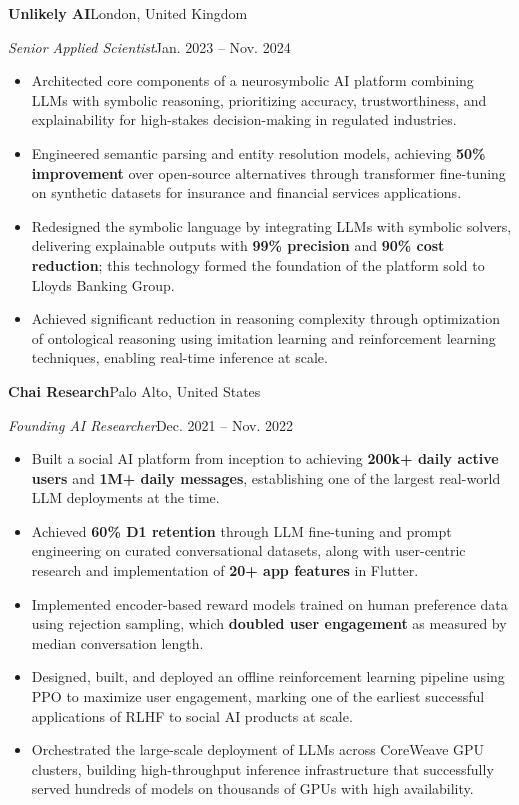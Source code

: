 \documentclass[10pt,a4paper]{article}
\newcommand{\experience}[4]{%
    \textbf{#1}\hfill #2\par\vspace{-0.5\baselineskip}%
    \textit{#3}\hfill #4\par\vspace{-0.5\baselineskip}%
}
\begin{document}
\experience{Unlikely AI}{London, United Kingdom}
{Senior Applied Scientist}{Jan. 2023 -- Nov. 2024}
\begin{itemize}
    \item Architected core components of a neurosymbolic AI platform combining LLMs with symbolic reasoning, prioritizing accuracy, trustworthiness, and explainability for high-stakes decision-making in regulated industries.
    \item Engineered semantic parsing and entity resolution models, achieving \textbf{50\% improvement} over open-source alternatives through transformer fine-tuning on synthetic datasets for insurance and financial services applications.
    \item Redesigned the symbolic language by integrating LLMs with symbolic solvers, delivering explainable outputs with \textbf{99\% precision} and \textbf{90\% cost reduction}; this technology formed the foundation of the platform sold to Lloyds Banking Group.
    \item Achieved significant reduction in reasoning complexity through optimization of ontological reasoning using imitation learning and reinforcement learning techniques, enabling real-time inference at scale.
\end{itemize}

\experience{Chai Research}{Palo Alto, United States}
{Founding AI Researcher}{Dec. 2021 -- Nov. 2022}
\begin{itemize}
    \item Built a social AI platform from inception to achieving \textbf{200k+ daily active users} and \textbf{1M+ daily messages}, establishing one of the largest real-world LLM deployments at the time.
    \item Achieved \textbf{60\% D1 retention} through LLM fine-tuning and prompt engineering on curated conversational datasets, along with user-centric research and implementation of \textbf{20+ app features} in Flutter.
    \item Implemented encoder-based reward models trained on human preference data using rejection sampling, which \textbf{doubled user engagement} as measured by median conversation length.
    \item Designed, built, and deployed an offline reinforcement learning pipeline using PPO to maximize user engagement, marking one of the earliest successful applications of RLHF to social AI products at scale.
    \item Orchestrated the large-scale deployment of LLMs across CoreWeave GPU clusters, building high-throughput inference infrastructure that successfully served hundreds of models on thousands of GPUs with high availability.
\end{itemize}
\end{document}
